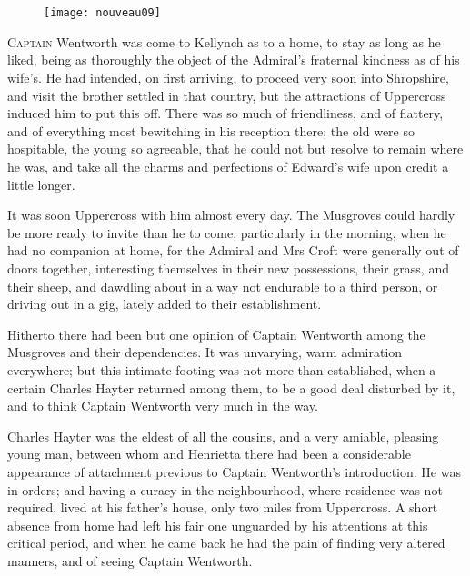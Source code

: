 \chapter[Chapter \thechapter]{}

\begin{figure}[t!]
\centering
\texttt{[image: nouveau09]}
\end{figure}

\lettrine[lraise=0.3]{C}{aptain} Wentworth was come to Kellynch as to a home, to stay as long as he liked, being as thoroughly the object of the Admiral's fraternal kindness as of his wife's. He had intended, on first arriving, to proceed very soon into Shropshire, and visit the brother settled in that country, but the attractions of Uppercross induced him to put this off. There was so much of friendliness, and of flattery, and of everything most bewitching in his reception there; the old were so hospitable, the young so agreeable, that he could not but resolve to remain where he was, and take all the charms and perfections of Edward's wife upon credit a little longer.

It was soon Uppercross with him almost every day. The Musgroves could hardly be more ready to invite than he to come, particularly in the morning, when he had no companion at home, for the Admiral and Mrs Croft were generally out of doors together, interesting themselves in their new possessions, their grass, and their sheep, and dawdling about in a way not endurable to a third person, or driving out in a gig, lately added to their establishment.

Hitherto there had been but one opinion of Captain Wentworth among the Musgroves and their dependencies. It was unvarying, warm admiration everywhere; but this intimate footing was not more than established, when a certain Charles Hayter returned among them, to be a good deal disturbed by it, and to think Captain Wentworth very much in the way.

Charles Hayter was the eldest of all the cousins, and a very amiable, pleasing young man, between whom and Henrietta there had been a considerable appearance of attachment previous to Captain Wentworth's introduction. He was in orders; and having a curacy in the neighbourhood, where residence was not required, lived at his father's house, only two miles from Uppercross. A short absence from home had left his fair one unguarded by his attentions at this critical period, and when he came back he had the pain of finding very altered manners, and of seeing Captain Wentworth.

